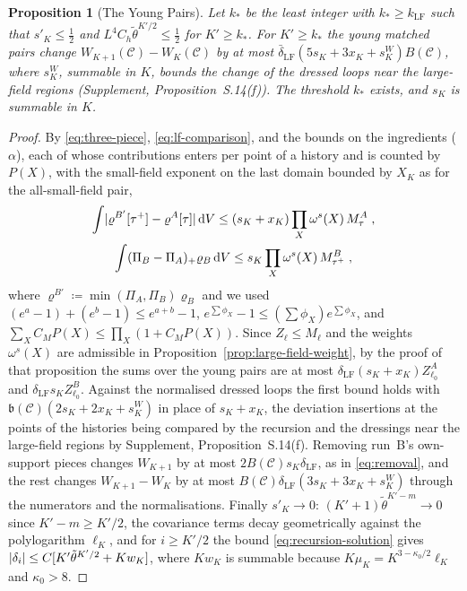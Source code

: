 \documentclass[11pt]{preprint}
\newcommand{\dd}{\mathrm{d}}
\DeclarePairedDelimiter{\abs}{\lvert}{\rvert}
\numberwithin{equation}{section}
\newtheorem{proposition}[theorem]{Proposition}
\theoremstyle{definition}
\theoremstyle{remark}
\theoremstyle{plain}
\begin{document}
\begin{proposition}[The Young Pairs]\label{prop:young-pairs}
Let $k_*$ be the least integer with $k_* \geq k_{\mathrm{LF}}$ such that $s'_K \leq \frac12$ and $L^4C_h\tilde\theta^{K'/2} \leq \frac12$ for $K' \geq k_*$. For $K' \geq k_*$ the young matched pairs change $W_{K+1}(\mathcal C) - W_K(\mathcal C)$ by at most $\bar\delta_{\mathrm{LF}}(5s_K + 3x_K + s^{W}_K)B(\mathcal C)$, where $s^W_K$, summable in $K$, bounds the change of the dressed loops near the large-field regions (Supplement, Proposition~S.14(f)). The threshold $k_*$ exists, and $s_K$ is summable in $K$.
\end{proposition}

\begin{proof}
By \eqref{eq:three-piece}, \eqref{eq:lf-comparison}, and the bounds on the ingredients ($\alpha$), each of whose contributions enters per point of a history and is counted by $P(X)$, with the small-field exponent on the last domain bounded by $X_K$ as for the all-small-field pair,
\begin{equation}\label{eq:young-pair-bound}
\begin{gathered}
    \int\abs{\varrho^{B'}[\tau^+] - \varrho^A[\tau]}\,\dd V \leq (s_K + x_K)\prod_{X}\omega^s(X)\,M^A_\tau\;,\\
    \int(\Pi_B - \Pi_A)_+\varrho_B\,\dd V \leq s_K\prod_X\omega^s(X)\,M^B_{\tau^+}\;,
\end{gathered}
\end{equation}
where $\varrho^{B'} \coloneqq \min(\Pi_A, \Pi_B)\varrho_B$ and we used $(e^a - 1) + (e^b - 1) \leq e^{a+b} - 1$, $e^{\sum\phi_X} - 1 \leq (\sum\phi_X)e^{\sum\phi_X}$, and $\sum_XC_MP(X) \leq \prod_X(1 + C_MP(X))$. Since $Z_\ell \leq M_\ell$ and the weights $\omega^s(X)$ are admissible in Proposition~\ref{prop:large-field-weight}, by the proof of that proposition the sums over the young pairs are at most $\delta_{\mathrm{LF}}(s_K + x_K)Z^A_{\ell_0}$ and $\delta_{\mathrm{LF}}s_KZ^B_{\ell_0}$. Against the normalised dressed loops the first bound holds with $\mathfrak b(\mathcal C)(2s_K + 2x_K + s^W_K)$ in place of $s_K + x_K$, the deviation insertions at the points of the histories being compared by the recursion and the dressings near the large-field regions by Supplement, Proposition~S.14(f). Removing run~B's own-support pieces changes $W_{K+1}$ by at most $2B(\mathcal C)s_K\delta_{\mathrm{LF}}$, as in \eqref{eq:removal}, and the rest changes $W_{K+1} - W_K$ by at most $B(\mathcal C)\delta_{\mathrm{LF}}(3s_K + 3x_K + s^W_K)$ through the numerators and the normalisations. Finally $s'_K \to 0$: $(K' + 1)\tilde\theta^{K'-m} \to 0$ since $K' - m \geq K'/2$, the covariance terms decay geometrically against the polylogarithm $\ell_K$, and for $i \geq K'/2$ the bound \eqref{eq:recursion-solution} gives $\abs{\delta_i} \leq C[K'\tilde\theta^{K'/2} + Kw_K]$, where $Kw_K$ is summable because $K\mu_K = K^{3-\kappa_0/2}\ell_K$ and $\kappa_0 > 8$.
\end{proof}
\end{document}
